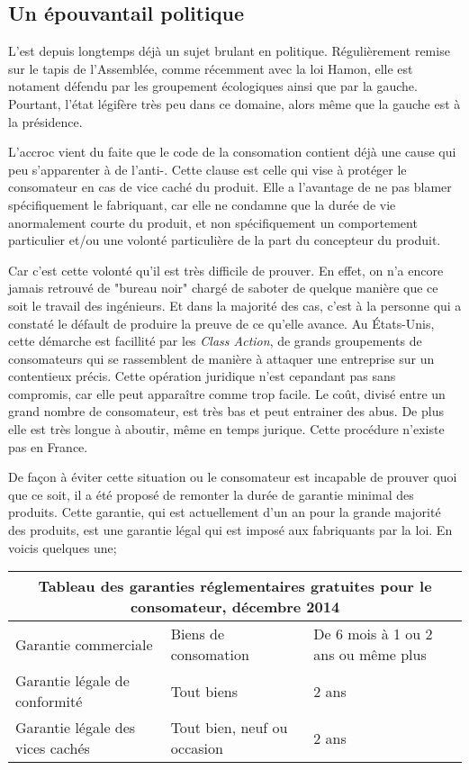 \subsection{Un épouvantail politique}
L'\op est depuis longtemps déjà un sujet brulant en politique. Régulièrement remise sur le tapis de l'Assemblée, comme récemment avec la loi Hamon, elle est notament défendu par les groupement écologiques\cite{OpEcoScenat} ainsi que par la gauche.
Pourtant, l'état légifère très peu dans ce domaine, alors même que la gauche est à la présidence.

\smallbreak L'accroc vient du faite que le code de la consomation contient déjà une cause qui peu s'apparenter à de l'anti-\op.
Cette clause est celle qui vise à protéger le consomateur en cas de vice caché du produit. 
Elle a l'avantage de ne pas blamer spécifiquement le fabriquant, car elle ne condamne que la durée de vie anormalement courte du produit, et non spécifiquement un comportement particulier et/ou une volonté particulière de la part du concepteur du produit.

\medbreak Car c'est cette volonté qu'il est très difficile de prouver. En effet, on n'a encore jamais retrouvé de "bureau noir" chargé de saboter de quelque manière que ce soit le travail des ingénieurs. Et dans la majorité des cas, c'est à la personne qui a constaté le défault de produire la preuve de ce qu'elle avance.
Au États-Unis, cette démarche est facillité par les \textit{Class Action}, de grands groupements de consomateurs qui se rassemblent de manière à attaquer une entreprise sur un contentieux précis. Cette opération juridique n'est cepandant pas sans compromis, car elle peut apparaître comme trop facile.
Le coût, divisé entre un grand nombre de consomateur, est très bas et peut entrainer des abus.
De plus elle est très longue à aboutir, même en temps jurique.
Cette procédure n'existe pas en France.

\smallbreak De façon à éviter cette situation ou le consomateur est incapable de prouver quoi que ce soit, il a été proposé de remonter la durée de garantie minimal des produits. Cette garantie, qui est actuellement d'un an pour la grande majorité des produits, est une garantie légal qui est imposé aux fabriquants par la loi. 
En voicis quelques une;

\begin{center}
\begin{tabular}{|l|l|l|}
  \hline
  \multicolumn{3}{|c|}{Tableau des garanties réglementaires gratuites pour le consomateur, décembre 2014} \\
	\hline Garantie commerciale & Biens de consomation & De 6 mois à 1 ou 2 ans ou même plus\\
	       Garantie légale de conformité & Tout biens & 2 ans \\
	       Garantie légale des vices cachés & Tout bien, neuf ou occasion & 2 ans \\
	\hline
\end{tabular}
\end{center}

